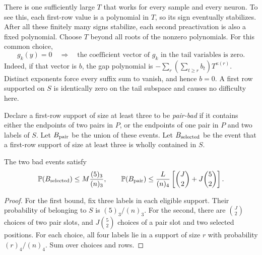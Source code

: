 There is one sufficiently large $T$ that works for every sample and every
neuron. To see this, each first-row value is a polynomial in $T$, so its
sign eventually stabilizes. After all these finitely many signs stabilize,
each second preactivation is also a fixed polynomial. Choose $T$ beyond
all roots of the nonzero polynomials. For this common choice,
\begin{equation}\label{eq:zero-tail-gradient}
 g_k(y)=0\quad\Longrightarrow\quad
 \text{the coefficient vector of $g_k$ in the tail variables is zero}.
\end{equation}
Indeed, if that vector is $b$, the gap polynomial is
$-\sum_r(\sum_{t\ge r}b_t)T^{\kappa(r)}$. Distinct exponents force every
suffix sum to vanish, and hence $b=0$. A first row supported on $S$ is
identically zero on the tail subspace and causes no difficulty here.

Declare a first-row support of size at least three to be \emph{pair-bad}
if it contains either the endpoints of two pairs in $P$, or the endpoints
of one pair in $P$ and two labels of $S$. Let $B_{\rm pair}$ be the union
of these events. Let $B_{\rm selected}$ be the event that a first-row
support of size at least three is wholly contained in $S$.

\begin{lemma}\label{lem:fixed-pair-errors}
The two bad events satisfy
\[
 \mathbb P(B_{\rm selected})\le M\frac{(5)_3}{(n)_3},
 \qquad
 \mathbb P(B_{\rm pair})\le
 \frac{L}{(n)_4}\left[\binom J2+J\binom52\right].
\]
\end{lemma}
\begin{proof}
For the first bound, fix three labels in each eligible support. Their
probability of belonging to $S$ is $(5)_3/(n)_3$.
For the second, there are $\binom J2$ choices of two pair slots, and
$J\binom52$ choices of a pair slot and two selected positions. For each
choice, all four labels lie in a support of size $r$ with probability
$(r)_4/(n)_4$. Sum over choices and rows.
\end{proof}

